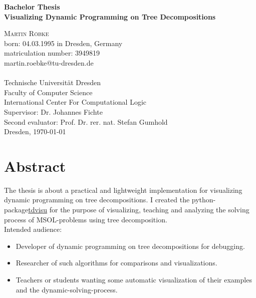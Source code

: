 \documentclass[a4paper, 12pt]{scrartcl}
\begin{document}
\begin{titlepage}
	\begin{center}
		{\Large\bfseries Bachelor Thesis}           \\[6.5ex]
		
		{\huge\bfseries Visualizing Dynamic Programming on Tree Decompositions}                  \\[6.5ex]
		
		\vspace{6ex}
				
		\textsc{\Large Martin Röbke}    \\[3ex]
		{\Large born: 04.03.1995 in Dresden, Germany}    \\[2ex]
		{\Large matriculation number: 3949819}    \\[2ex]
		{\Large martin.roebke@tu-dresden.de}    \\[2ex]
		\textsc{\large 
			}             \\[12ex]
		\vfill
		{\Large Technische Universität Dresden}               \\
		Faculty of Computer Science \\
		International Center For Computational Logic 		\\[5ex]
		
		{\Large Supervisor: Dr. Johannes Fichte}\\[2ex]
		{\Large Second evaluator:  Prof. Dr. rer. nat. Stefan Gumhold}\\[5ex]
		
		\vfill
		Dresden, \today
	\end{center}
\end{titlepage}


\section*{Abstract}
\vspace{4ex}
The thesis is about a practical and lightweight implementation for visualizing dynamic programming on tree decompositions.
I created the python-package\href{https://pypi.org/project/tdvisu}{tdvisu} for the purpose of visualizing, teaching and analyzing the solving process of MSOL-problems using tree decomposition. \\
Intended audience: 
\begin{itemize}
	\item  Developer of dynamic programming on tree decompositions for debugging.
	\item Researcher of such algorithms for comparisons and visualizations.
	\item Teachers or students wanting some automatic visualization of their examples and the dynamic-solving-process.
\end{itemize} 
\end{document}
